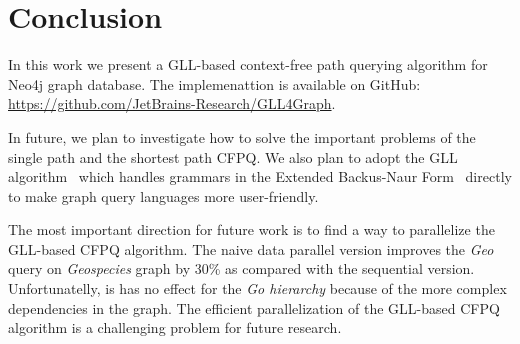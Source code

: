 \section{Conclusion}

In this work we present a GLL-based context-free path querying algorithm for Neo4j graph database. The implemenattion is available on GitHub: \url{https://github.com/JetBrains-Research/GLL4Graph}.

In future, we plan to investigate how to solve the important problems of the single path and the shortest path CFPQ. 
We also plan to adopt the GLL algorithm~\cite{SCOTT2018120} which handles grammars in the Extended Backus-Naur Form~\cite{10.1007/978-3-642-00982-2_35} directly to make graph query languages more user-friendly. 

The most important direction for future work is to find a way to parallelize the GLL-based CFPQ algorithm. The naive data parallel version improves the \textit{Geo} query on \textit{Geospecies} graph by 30\% as compared with the sequential version. Unfortunatelly, is has no effect for the \textit{Go hierarchy} because of the more complex dependencies in the graph. The efficient parallelization of the GLL-based CFPQ algorithm is a challenging problem for future research. 
